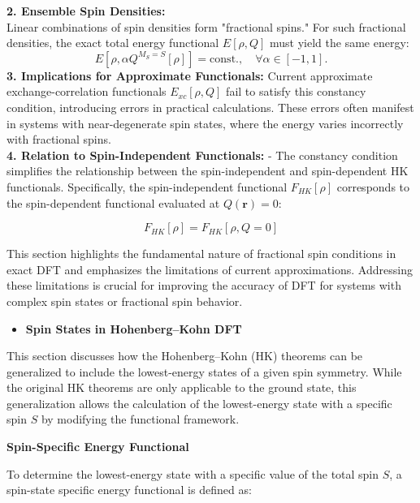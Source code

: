 \documentclass[%
 preprint, linenumbers,
 amsmath,amssymb,
 aps, physrev,
]{revtex4-2}
\begin{document}
\textbf{
2. Ensemble Spin Densities:}\\
    Linear combinations of spin densities form "fractional spins." For such fractional densities, the exact total energy functional \( E[\rho, Q] \) must yield the same energy:
     \begin{equation}
         E[\rho, \alpha Q^{M_S=S}[\rho]] = \text{const.}, \quad \forall \alpha \in [-1, 1].
     \end{equation}
\textbf{
3. Implications for Approximate Functionals:}
   Current approximate exchange-correlation functionals \( E_{xc}[\rho, Q] \) fail to satisfy this constancy condition, introducing errors in practical calculations. These errors often manifest in systems with near-degenerate spin states, where the energy varies incorrectly with fractional spins.\\

\textbf{4. Relation to Spin-Independent Functionals:}
   - The constancy condition simplifies the relationship between the spin-independent and spin-dependent HK functionals. Specifically, the spin-independent functional \( F_{HK}[\rho] \) corresponds to the spin-dependent functional evaluated at \( Q(\mathbf{r}) = 0 \):
   
     \begin{equation}
          F_{HK}[\rho] = F_{HK}[\rho, Q = 0]
     \end{equation}

This section highlights the fundamental nature of fractional spin conditions in exact DFT and emphasizes the limitations of current approximations. Addressing these limitations is crucial for improving the accuracy of DFT for systems with complex spin states or fractional spin behavior. 




\begin{itemize}
    \item \textbf{Spin States in Hohenberg–Kohn DFT}
\end{itemize}

This section discusses how the Hohenberg–Kohn (HK) theorems can be generalized to include the lowest-energy states of a given spin symmetry. While the original HK theorems are only applicable to the ground state, this generalization allows the calculation of the lowest-energy state with a specific spin \( S \) by modifying the functional framework.

\textbf{ Spin-Specific Energy Functional}

To determine the lowest-energy state with a specific value of the total spin \( S \), a spin-state specific energy functional is defined as:
\end{document}
